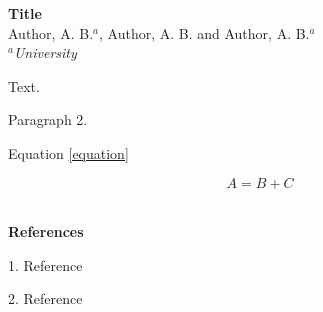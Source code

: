 \setlength{\textwidth}{160mm}\setlength{\textheight}{240mm}
\setlength{\oddsidemargin}{0mm}\setlength{\evensidemargin}{0mm}
\setlength{\topmargin}{-15mm}
\setlength{\parindent}{0mm} 
\pagestyle{empty}	%

\begin{center}
{\large\bf Title}\\[4mm]

Author, A. B.$^a$, Author, A. B. and Author, A. B.$^a$\\ 				

{\small \em $^a$University}\\[3mm]
\end{center}


Text. 
\medskip

Paragraph 2.
\medskip

Equation \ref{equation}

\begin{equation}
A=B+C
\label{equation}  
\end{equation}

\\

{\bf References }
\medskip

1. Reference
\smallskip

2. Reference
